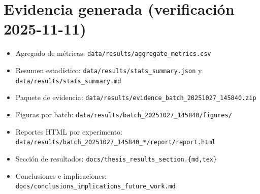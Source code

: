 \documentclass[12pt,oneside]{report}
\begin{document}
\chapter{Evidencia generada (verificación 2025-11-11)}
\begin{itemize}
    \item Agregado de métricas: \texttt{data/results/aggregate\_metrics.csv}
    \item Resumen estadístico: \texttt{data/results/stats\_summary.json} y \texttt{data/results/stats\_summary.md}
    \item Paquete de evidencia: \texttt{data/results/evidence\_batch\_20251027\_145840.zip}
    \item Figuras por batch: \texttt{data/results/batch\_20251027\_145840/figures/}
    \item Reportes HTML por experimento: \texttt{data/results/batch\_20251027\_145840\_*/report/report.html}
    \item Sección de resultados: \texttt{docs/thesis\_results\_section.\{md,tex\}}
    \item Conclusiones e implicaciones: \texttt{docs/conclusions\_implications\_future\_work.md}
\end{itemize}

\printbibliography[heading=bibintoc,title={Bibliografía}]
\end{document}
